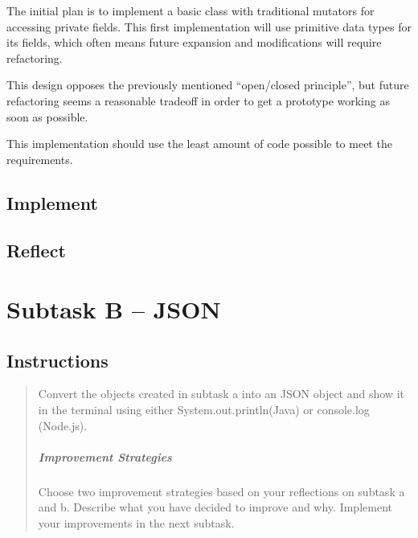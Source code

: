 The initial plan is to implement a basic class with traditional mutators for
accessing private fields. This first implementation will use primitive data
types for its fields, which often means future expansion and modifications will
require refactoring. 

This design opposes the previously mentioned ``open/closed principle'', but
future refactoring seems a reasonable tradeoff in order to get a prototype
working as soon as possible.

This implementation should use the least amount of code possible to meet the
requirements.




\subsection{Implement}\label{implement}

\subsection{Reflect}\label{reflect}


\section{Subtask B -- JSON}\label{subtask-b-json}

\subsection{Instructions}\label{instructions-2}

\begin{quote}
Convert the objects created in subtask a into an JSON object and show it
in the terminal using either System.out.println(Java) or console.log
(Node.js).

\mbox{}%
\subparagraph{Improvement Strategies}\label{improvement-strategies}

Choose two improvement strategies based on your reflections on subtask a
and b. Describe what you have decided to improve and why. Implement your
improvements in the next subtask.
\end{quote}


